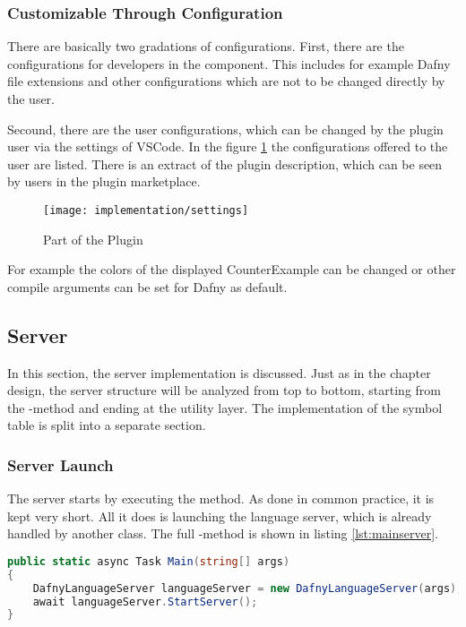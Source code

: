 \subsubsection{Customizable Through Configuration}
There are basically two gradations of configurations.
First, there are the configurations for developers in the  component.
This includes for example Dafny file extensions and other configurations which are not to be changed directly by the user.

Secound, there are the user configurations, which can be changed by the plugin user via the settings of VSCode.
In the figure \ref{fig:settings} the configurations offered to the user are listed.
There is an extract of the plugin description, which can be seen by users in the plugin marketplace.

\begin{figure}[H]
    \centering
    \texttt{[image: implementation/settings]}
    \caption{Part of the Plugin }
    \label{fig:settings}
\end{figure}

For example the colors of the displayed CounterExample can be changed or other compile arguments can be set for Dafny as default.

\subsection{Server}
In this section, the server implementation is discussed.
Just as in the chapter design, the server structure will be analyzed from top to bottom, starting from the -method and ending at the utility layer.
The implementation of the symbol table is split into a separate section.

\subsubsection{Server Launch}
The server starts by executing the  method.
As done in common practice, it is kept very short.
All it does is launching the language server, which is already handled by another class.
The full -method is shown in listing \ref{lst:mainserver}.

\begin{lstlisting}[language=csharp, caption={Main Function}, captionpos=b, label={lst:mainserver}]
public static async Task Main(string[] args)
{
    DafnyLanguageServer languageServer = new DafnyLanguageServer(args);
    await languageServer.StartServer();
}
\end{lstlisting}

